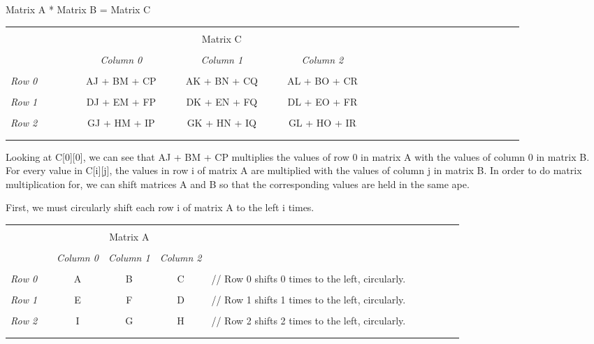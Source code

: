 \documentclass[10pt]{article}
\begin{document}
Matrix A * Matrix B = Matrix C

\begin{tabular}{l*{26}{c}r}
  \\
  \\
  & & & & & & & & Matrix C\\
  \\
  & & & & &
  \textit{Column 0} & & &
  \textit{Column 1} & & &
  \textit{Column 2} \\
  \\
  \textit{Row 0} & & & & &
  AJ + BM + CP &&& AK + BN + CQ &&& AL + BO + CR \\
  \\
  \textit{Row 1} & & & & &
  DJ + EM + FP &&& DK + EN + FQ &&& DL + EO + FR \\
  \\
  \textit{Row 2} & & & & &
  GJ + HM + IP &&& GK + HN + IQ &&& GL + HO + IR \\
  \\
  \\
\end{tabular}

Looking at C[0][0], we can see that AJ + BM + CP multiplies the values of row 0 in matrix A with the values of column 0 in matrix B.  For every value in C[i][j], the values in row i of matrix A are multiplied with the values of column j in matrix B.  In order to do matrix multiplication for, we can shift matrices A and B so that the corresponding values are held in the same ape. \par
First, we must circularly shift each row i of matrix A to the left i times. \par
  
\begin{tabular}{l*{9}{c}r}
  \\
  \\
  & & & Matrix A \\
  \\
  & &
  \textit{Column 0} &
  \textit{Column 1} &
  \textit{Column 2} & \\
  \\
  \textit{Row 0} & & A & B & C & // Row 0 shifts 0 times to the left, circularly.\\
  \\
  \textit{Row 1} & & E & F & D & // Row 1 shifts 1 times to the left, circularly.\\
  \\
  \textit{Row 2} & & I & G & H & // Row 2 shifts 2 times to the left, circularly.\\
  \\
  \\
\end{tabular}
\end{document}
